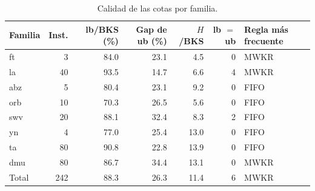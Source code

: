 \begin{table}[H]
  \centering
  \small
  \singlespacing
  \caption{Calidad de las cotas por familia.}
  \label{tab:cotas}
  \begin{tabular}{lrrrrrl}
    \toprule
    Familia & Inst. & lb/BKS (\%) & Gap de ub (\%) & $H$/BKS & lb $=$ ub & Regla más frecuente \\
    \midrule
    ft & 3 & 84.0 & 23.1 & 4.5 & 0 & MWKR \\
    la & 40 & 93.5 & 14.7 & 6.6 & 4 & MWKR \\
    abz & 5 & 80.4 & 23.1 & 9.2 & 0 & FIFO \\
    orb & 10 & 70.3 & 26.5 & 5.6 & 0 & FIFO \\
    swv & 20 & 88.1 & 32.4 & 8.3 & 2 & FIFO \\
    yn & 4 & 77.0 & 25.4 & 13.0 & 0 & FIFO \\
    ta & 80 & 90.8 & 22.8 & 13.9 & 0 & FIFO \\
    dmu & 80 & 86.7 & 34.4 & 13.1 & 0 & MWKR \\
    \midrule
    Total & 242 & 88.3 & 26.3 & 11.4 & 6 & MWKR \\
    \bottomrule
  \end{tabular}
  \par\vspace{2pt}{\footnotesize lb: cota inferior; ub: mejor programa de Giffler-Thompson; $H$: horizonte del modelo original (suma de duraciones).}
\end{table}
